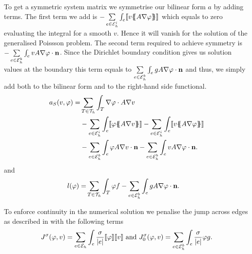 To get a symmetric system matrix we symmetrise our bilinear form $a$ by adding terms. 
The first term we add is  $- \sum\limits_{e \in \mathcal{E}_h^i}\int_{e} \llbracket  v \{\!\!\{  A \nabla \varphi \}\!\!\} \rrbracket$ which equals to zero evaluating the integral for a smooth $v$. Hence it will vanish for the solution of the generalised Poissson problem. The second term required to achieve symmetry is  $-\sum\limits_{e \in \mathcal{E}_h^b}\int_{e} v A \nabla \varphi \cdot \mathbf n$. Since the Dirichlet boundary condition gives us solution values at the boundary this term equals to $\sum\limits_{e \in \mathcal{E}_h^b}\int_{e} g A \nabla \varphi \cdot \mathbf n$ and thus, we simply add both to the bilinear form and to the right-hand side functional.
\begin{align}
 a_S(v, \varphi) = &\sum\limits_{T \in \triang} \int_T \nabla \varphi \cdot A \nabla v \nonumber \\
  &-\sum\limits_{e \in \edgesi}\int_{e} \jump {\varphi \average{A \nabla v} }
 - \sum\limits_{e \in \edgesi}\int_{e} \jump{ v \average{ A \nabla \varphi}} \nonumber\\ 
 & - \sum\limits_{e \in \edgesb}\int_{e} \varphi A \nabla v \cdot \mathbf n 
    - \sum\limits_{e \in \edgesb}\int_{e} v A \nabla \varphi \cdot \mathbf n. \label{eq:inner product SIPG}
\end{align}
and 
\begin{align}
	l(\varphi) =& \sum\limits_{T \in \mathcal{T}_h} \int_T \varphi f -\sum\limits_{e \in \mathcal{E}_h^b}\int_{e} g A \nabla \varphi \cdot \mathbf n.
\end{align} 


To enforce continuity in the numerical solution we penalise the jump across edges as described in  \cite[3.2.2.]{PPO+2000} with the following terms
\begin{align}
	J^\sigma(\varphi, v) = \sum\limits_{e \in \mathcal{E}_h} \int_e \frac \sigma {|e|} \llbracket \varphi \rrbracket \llbracket v \rrbracket \textnormal{ and } 	J^\sigma_0(\varphi, v) = \sum\limits_{e \in \mathcal{E}_h^b} \int_e \frac \sigma {|e|} \varphi g .
\end{align}

